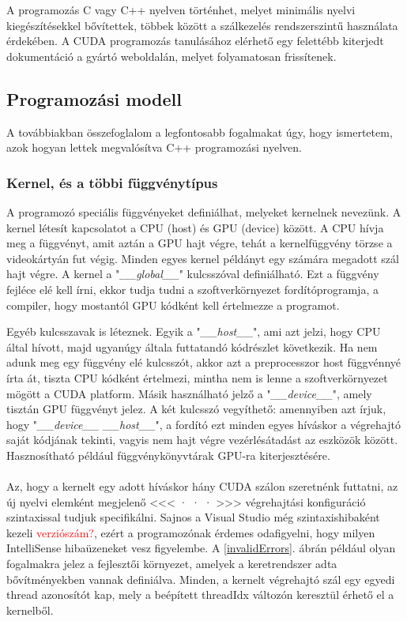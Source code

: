 A programozás C vagy C++ nyelven történhet, melyet minimális nyelvi kiegészítésekkel bővítettek, többek között a szálkezelés rendszerszintű használata érdekében. A CUDA programozás tanulásához elérhető egy felettébb kiterjedt dokumentáció a gyártó weboldalán, melyet folyamatosan frissítenek. \cite{CUDAdoc}

\subsection{Programozási modell }
A továbbiakban összefoglalom a legfontosabb fogalmakat úgy, hogy ismertetem, azok hogyan lettek megvalósítva C++ programozási nyelven.

\subsubsection{Kernel, és a többi függvénytípus}
A programozó speciális függvényeket definiálhat, melyeket kernelnek nevezünk. A kernel létesít kapcsolatot a CPU (host) és GPU (device) között. A CPU hívja meg a függvényt, amit aztán a GPU hajt végre, tehát a kernelfüggvény törzse a videokártyán fut végig. Minden egyes kernel példányt egy számára megadott szál hajt végre.
A kernel a "\textit{\_\_global\_\_}" kulcsszóval definiálható. Ezt a függvény fejléce elé kell írni, ekkor tudja tudni a szoftverkörnyezet fordítóprogramja, a compiler, hogy mostantól GPU kódként kell értelmezze a programot. 

Egyéb kulcsszavak is léteznek. Egyik a "\textit{\_\_host\_\_}", ami azt jelzi, hogy CPU által hívott, majd ugyanúgy általa futtatandó kódrészlet következik. Ha nem adunk meg egy függvény elé kulcsszót, akkor azt a preprocesszor host függvénnyé írta át, tiszta CPU kódként értelmezi, mintha nem is lenne a szoftverkörnyezet mögött a CUDA platform. Másik használható jelző a "\textit{\_\_device\_\_}", amely tisztán GPU függvényt jelez. A két kulcsszó vegyíthető: amennyiben azt írjuk, hogy "\textit{\_\_device\_\_ \_\_host\_\_}", a fordító ezt minden egyes híváskor a végrehajtó saját kódjának tekinti, vagyis nem hajt végre vezérlésátadást az eszközök között. Hasznosítható például függvénykönyvtárak GPU-ra kiterjesztésére.

\paragraph{}
Az, hogy a kernelt egy adott híváskor hány CUDA szálon szeretnénk futtatni, az új nyelvi elemként megjelenő <<< · · · >>> végrehajtási konfiguráció szintaxissal tudjuk specifikálni. Sajnos a Visual Studio még szintaxishibaként kezeli \textcolor{red}{verziószám?}, ezért a programozónak érdemes odafigyelni, hogy milyen IntelliSense hibaüzeneket vesz figyelembe. A \ref{invalidErrors}. ábrán például olyan fogalmakra jelez a fejlesztői környezet, amelyek a keretrendszer adta bővítményekben vannak definiálva. Minden, a kernelt végrehajtó szál egy egyedi thread azonosítót kap, mely a beépített threadIdx változón keresztül érhető el a kernelből.


